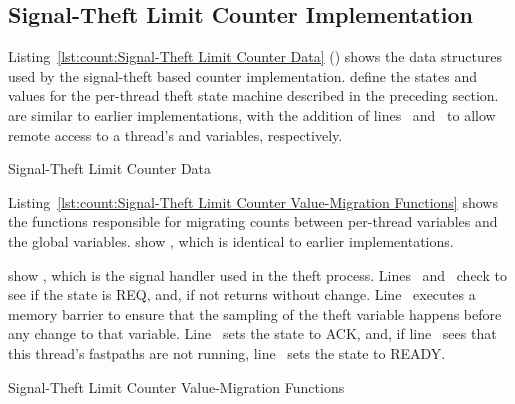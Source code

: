 \subsection{Signal-Theft Limit Counter Implementation}
\label{sec:count:Signal-Theft Limit Counter Implementation}

\begin{fcvref}
Listing~\ref{lst:count:Signal-Theft Limit Counter Data}
()
shows the data structures used by the signal-theft based counter
implementation.
 define the states and values
for the per-thread theft state machine
described in the preceding section.
 are similar to earlier implementations,
with the addition of
lines~ and~ to allow remote access to a
thread's 
and  variables, respectively.
\end{fcvref}

\begin{listing}[tbp]

\caption{Signal-Theft Limit Counter Data}
\label{lst:count:Signal-Theft Limit Counter Data}
\end{listing}

\begin{fcvref}
Listing~\ref{lst:count:Signal-Theft Limit Counter Value-Migration Functions}
shows the functions responsible for migrating counts between per-thread
variables and the global variables.
 show ,
which is identical to earlier
implementations.
\end{fcvref}
\begin{fcvref}
 show ,
which is the signal
handler used in the theft process.
Lines~ and~ check to see if
the  state is REQ, and, if not
returns without change.
Line~ executes a memory barrier to ensure that the sampling of the
theft variable happens before any change to that variable.
Line~ sets the  state to ACK, and, if
line~ sees that
this thread's fastpaths are not running, line~ sets the 
state to READY\@.
\end{fcvref}

\begin{listing}[tbp]

\caption{Signal-Theft Limit Counter Value-Migration Functions}
\label{lst:count:Signal-Theft Limit Counter Value-Migration Functions}
\end{listing}

